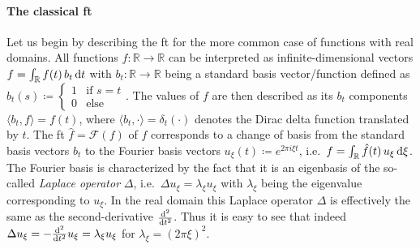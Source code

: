 \paragraph{The classical \acl{ft}}
Let us begin by describing the \ac{ft} for the more common case of functions with real domains.
All functions $f: \mathbb{R} \to \mathbb{R}$ can be interpreted as infinite-dimensional vectors $f = \int_{\mathbb{R}} f(t)\, b_t \mathop{}\!\mathrm{d} t$ with $b_t: \mathbb{R} \to \mathbb{R}$ being a standard basis vector/function defined as $b_t(s) \coloneqq \begin{cases} 1 & \text{if } s = t \\[-6pt] 0 & \text{else} \end{cases}$. %
The values of $f$ are then described as its $b_t$ components $\langle b_t, f \rangle = f(t)$, where $\langle b_t, \cdot \rangle = \delta_t(\cdot)$ denotes the Dirac delta function translated by $t$.
The \acl{ft} $\hat{f} = \mathcal{F}(f)$ of $f$ corresponds to a change of basis from the standard basis vectors $b_t$ to the Fourier basis vectors $u_\xi(t) \coloneqq e^{2 \pi i \xi t}$, i.e.\ $f = \int_{\mathbb{R}} \hat{f}(t)\, u_\xi \mathop{}\!\mathrm{d} \xi$.
The Fourier basis is characterized by the fact that it is an eigenbasis of the so-called \textit{Laplace operator} $\Delta$, i.e.\ $\Delta u_\xi = \lambda_\xi u_\xi$ with $\lambda_\xi$ being the eigenvalue corresponding to $u_\xi$.
In the real domain this Laplace operator $\Delta$ is effectively the same as the second-derivative $\frac{\mathop{}\!\mathrm{d}^2}{\mathop{}\!\mathrm{d} t^2}$.
Thus it is easy to see that indeed $\Delta u_\xi = -\frac{\mathop{}\!\mathrm{d}^2}{\mathop{}\!\mathrm{d} t^2} u_\xi = \lambda_\xi u_\xi$ for $\lambda_\xi = {(2 \pi \xi)}^2$.


